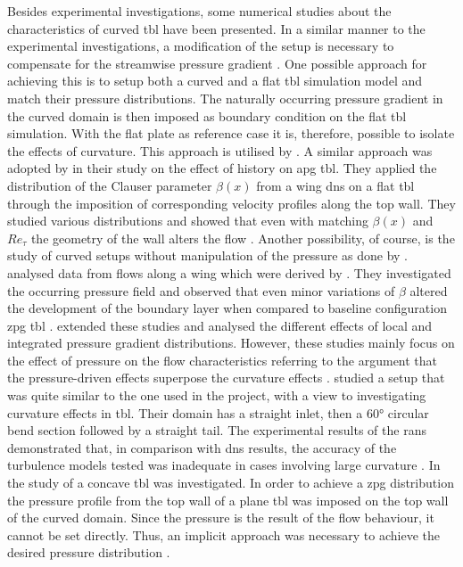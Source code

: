 Besides experimental investigations, some numerical studies about the characteristics of curved \acrshort{tbl} have been presented.
In a similar manner to the experimental investigations, a modification of the setup is necessary to compensate for the streamwise pressure gradient \citet{appelbaum_systematic_2025}. 
One possible approach for achieving this  is to setup  both a curved and a flat \acrshort{tbl} simulation model and match their pressure distributions.
The naturally occurring pressure gradient in the curved domain is then imposed as boundary condition on the flat \acrshort{tbl} simulation.
With the flat plate as reference case it is, therefore, possible to isolate the effects of curvature.
This approach is utilised  by \citet{spalart_direct_2024,pargal_adverse-pressure-gradient_2022}.
A similar approach was adopted by \citet{bobke_history_2017} in their study on the effect of history on \acrshort{apg} \acrshort{tbl}.
They applied the distribution of the Clauser parameter $\beta(x)$ from a wing \acrshort{dns} on a flat \acrshort{tbl} through the imposition of corresponding velocity profiles along the top wall.
They studied various distributions and showed that even with matching $\beta(x)$ and $Re_{\tau}$ the geometry of the wall alters the flow \citep{bobke_history_2017}.
Another possibility, of course, is the study of curved setups without manipulation of the pressure as done by \citet{vinuesa_pressure-gradient_2017,tanarro_effect_2020}.
\citet{vinuesa_pressure-gradient_2017} analysed data from flows along a wing which were derived by \citet{hosseini_direct_2016}.
They investigated the occurring pressure field and observed that even minor variations of $\beta$ altered
 the development of the boundary layer when compared to baseline configuration \acrshort{zpg} \acrshort{tbl} \citet{vinuesa_pressure-gradient_2017}.
\citet{tanarro_effect_2020} extended these studies and analysed the different effects of local and integrated pressure gradient distributions.
However, these studies mainly focus on the effect of pressure on the flow characteristics referring to the argument that the pressure-driven effects superpose the curvature effects \citep{patel_longitudinal_1997}.
\citet{yang_assessment_2016} studied a  setup that was quite similar  to the one used in the project, with a view  to investigating curvature effects in \acrshort{tbl}. 
Their domain has a straight inlet, then a 60° circular bend section followed by a straight tail.
The experimental results of the \acrshort{rans} demonstrated that, in comparison with \acrshort{dns} results, the accuracy of the  turbulence models tested was inadequate in cases involving large curvature \citep{yang_assessment_2016}.
In the study of \citep{appelbaum_systematic_2025} a concave \acrshort{tbl} was investigated. 
In order to achieve a \acrshort{zpg} distribution the pressure profile from the top wall of a plane \acrshort{tbl} was imposed on the top wall of the curved domain.
Since the pressure is the result of the flow behaviour, it cannot be set directly. Thus, an implicit approach was necessary to achieve the desired pressure distribution \citep{appelbaum_systematic_2025}.

